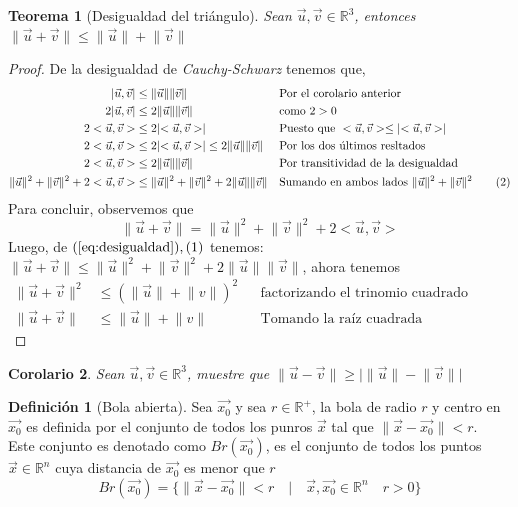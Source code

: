 \documentclass[letterpaper]{article}
\providecommand{\abs}[1]{\lvert#1\rvert}
\providecommand{\norm}[1]{\lVert#1\rVert}
\providecommand{\pint}[1]{<#1>}
\newcommand{\R}{\mathds{R}}
\renewcommand{\u}{\vec{u}}
\renewcommand{\v}{\vec{v}}
\renewcommand{\*}{\cdot}
\newtheorem{theorem}{Teorema}[section]
\newtheorem{corolario}[theorem]{Corolario}
\theoremstyle{definition}
\newtheorem{definition}{Definición}
\begin{document}
\newpage
\begin{theorem}[Desigualdad del triángulo]
	Sean $ \u, \v  \in \R^3$, entonces $ \norm{\u + \v} \leq \norm{\u} + \norm{\v} $
\end{theorem}
\begin{proof}
	De la desigualdad de \textit{ Cauchy-Schwarz} tenemos que, 
	\begin{align*}
		\abs{\u, \v} &\leq \norm{\u} \norm{\v} && \text{Por el corolario anterior}\\
		2\abs{\u, \v} &\leq 2\norm{\u} \norm{\v} && \text{como $ 2> 0 $}\\
		2\pint{\u, \v} &\leq 2 \abs{\pint{\u, \v}} && \text{Puesto que } \pint{\u, \v} \leq \abs{\pint{\u, \v}}\\
		2\pint{\u, \v} &\leq 2 \abs{\pint{\u, \v}} \leq  2\norm{\u}\norm{\v}  && \text{Por los dos últimos resltados}\\
		2\pint{\u, \v} &\leq  2\norm{\u}\norm{\v}  && \text{Por transitividad de la desigualdad }\\
		\norm{\u}^2 + \norm{\v}^2 + 2\pint{\u, \v} &\leq \norm{\u}^2 + \norm{\v}^2 + 2\norm{\u}\norm{\v}  && \text{Sumando en ambos lados } \norm{\u}^2 + \norm{\v}^2 \label{eq:desigualdad} \tag{2}\\
	\end{align*}
	Para concluir, observemos que $$ \norm{\u + \v} = \norm{\u}^2 + \norm{\v}^2 + 2 \pint{\u, \v} \label{eq:definicionInterno} \label{3} $$
	Luego, de $ (\ref{eq:desigualdad}), (1) $ tenemos: 
	$ \norm{\u + \v} \leq \norm{\u}^2 + \norm{\v}^2 + 2 \norm{\u} \norm{\v} $, ahora tenemos 
	\begin{align*}
	\norm{\u+ \v}^2 & \leq (\norm{\u} + \norm{v})^2 && \text{factorizando el trinomio cuadrado pefecto}\\
	\norm{\u+ \v} & \leq \norm{\u} + \norm{v} && \text{Tomando la raíz cuadrada}
	\end{align*}
\end{proof}
\begin{corolario}
	Sean $ \u, \v \in \R^3 $, muestre que $ \norm{\u - \v} \geq \abs{\norm{\u} - \norm{\v}} $
\end{corolario}
\begin{definition}[Bola abierta]
	Sea $ \vec{x_0} $ y sea $ r \in \R^+ $, la bola de radio $ r $ y centro en $ \vec{x_0} $ es definida por el conjunto de todos los punros $ \vec{x} $ tal que $ \norm{\vec{x} - \vec{x_0}} < r $.\\
	Este conjunto es denotado como $ Br(\vec{x_0}) $, es el conjunto de todos los puntos $ \vec{x} \in \R^n $ cuya distancia de $ \vec{x_0} $ es menor que $ r $
	\[ Br(\vec{x_0}) = \{  \norm{\vec{x} - \vec{x_0}} < r \quad | \quad \vec{x}, \vec{x_0} \in \R^n \quad r > 0 \} \]
\end{definition}
\end{document}
